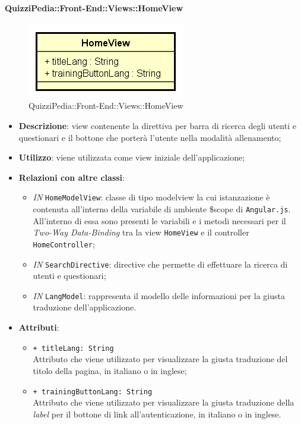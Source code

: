 \paragraph{QuizziPedia::Front-End::Views::HomeView}
\begin{figure} [ht]
	\centering
	\includegraphics[scale=0.45]{UML/Classi/Front-End/QuizziPedia_Front-end_Views_HomeView.png}
	\caption{QuizziPedia::Front-End::Views::HomeView}
\end{figure} \FloatBarrier
\begin{itemize}
	\item \textbf{Descrizione}: view contenente la direttiva per barra di ricerca degli utenti e questionari e il bottone che porterà l'utente nella modalità allenamento;
	\item \textbf{Utilizzo}: viene utilizzata come view iniziale dell'applicazione;
	\item \textbf{Relazioni con altre classi}:
	\begin{itemize}
		\item \textit{IN} \texttt{HomeModelView}: classe di tipo modelview la cui istanzazione è contenuta all'interno della variabile di ambiente \$scope di \texttt{Angular.js}. All'interno di essa sono presenti le variabili e i metodi necessari per il \textit{Two-Way Data-Binding} tra la view \texttt{HomeView} e il controller \texttt{HomeController};
		\item \textit{IN} \texttt{SearchDirective}: directive che permette di effettuare la ricerca di utenti e questionari;
		\item \textit{IN} \texttt{LangModel}: rappresenta il modello delle informazioni per la giusta traduzione dell'applicazione.
	\end{itemize}
	\item \textbf{Attributi}:
	\begin{itemize}
		\item \texttt{+ titleLang: String} \\ Attributo che viene utilizzato per visualizzare la giusta traduzione del titolo della pagina, in italiano o in inglese;
		\item \texttt{+ trainingButtonLang: String} \\ Attributo che viene utilizzato per visualizzare la giusta traduzione della \textit{label} per il bottone di link all'autenticazione, in italiano o in inglese.
	\end{itemize}
\end{itemize}
	

